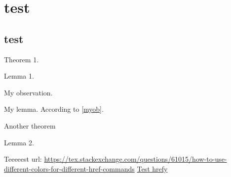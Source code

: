 \documentclass{fhw}
\begin{document}
\section{test}
\problem*
\blindtext
\problem*[8]
\subsection{test}
\problem*

\begin{theorem}
	Theorem 1. \blindtext
\end{theorem}

\begin{lemma}
	Lemma 1.
\end{lemma}

\begin{observation}
	My observation.
	\label{myob}
\end{observation}

\begin{lemma}[My lemma]
	My lemma.
	According to \cref{myob}.
\end{lemma}

\begin{theorem}[My theorem]
	Another theorem
\end{theorem}

\begin{lemma}
	Lemma 2.
\end{lemma}

Teeeeest url: \url{https://tex.stackexchange.com/questions/61015/how-to-use-different-colors-for-different-href-commands}
\href{https://en.wikibooks.org/wiki/LaTeX/Counters}{Test hrefy}
\end{document}
